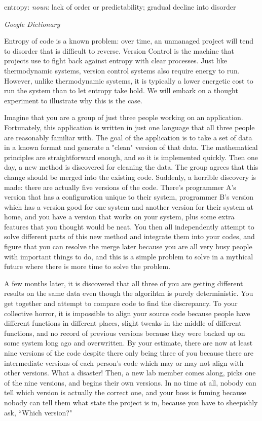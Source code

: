 \epigraph{entropy: \emph{noun}: lack of order or predictability; gradual
decline into disorder}{\textit{Google Dictionary}}

\par{
Entropy of code is a known problem: over time, an unmanaged project will tend
to disorder that is difficult to reverse. Version Control is the machine that
projects use to fight back against entropy with clear processes. Just like
thermodynamic systems, version control systems also require energy to run.
However, unlike thermodynamic systems, it is typically a lower energetic cost
to run the system than to let entropy take hold. We will embark on a thought
experiment to illustrate why this is the case. 
}

\par{
Imagine that you are a group of just three people working on an application.
Fortunately, this application is written in just one language that all three
people are reasonably familiar with. The goal of the application is to take a
set of data in a known format and generate a "clean" version of that data. The
mathematical principles are straightforward enough, and so it is implemented
quickly. Then one day, a new method is discovered for cleaning the data. The
group agrees that this change should be merged into the existing code.
Suddenly, a horrible discovery is made: there are actually five versions of
the code. There's programmer A's version that has a configuration unique to
their system, programmer B's version which has a version good for one system
and another version for their system at home, and you have a version that
works on your system, plus some extra features that you thought would be neat.
You then all independently attempt to solve different parts of this new method
and integrate them into your codes, and figure that you can resolve the merge
later because you are all very busy people with important things to do, and
this is a simple problem to solve in a mythical future where there is more
time to solve the problem.
}

\par{
A few months later, it is discovered that all three of you are getting
different results on the same data even though the algorihtm is purely
deterministic. You get together and attempt to compare code to find the
discrepancy. To your collective horror, it is impossible to align your source
code because people have different functions in different places, slight
tweaks in the middle of different functions, and no record of previous
versions because they were backed up on some system long ago and overwritten.
By your estimate, there are now at least nine versions of the code despite
there only being three of you because there are intermediate versions of each
person's code which may or may not align with other versions. What a disaster!
Then, a new lab member comes along, picks one of the nine versions, and begins
their own versions. In no time at all, nobody can tell which version is
actually the correct one, and your boss is fuming because nobody can tell them
what state the project is in, because you have to sheepishly ask, ``Which
version?"
}

